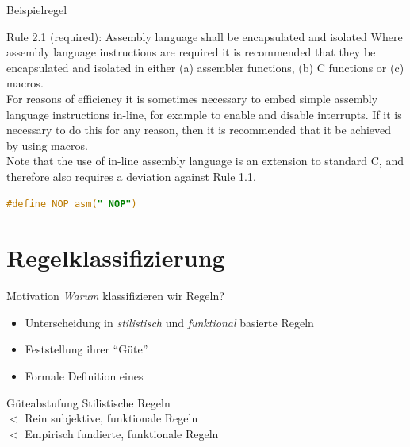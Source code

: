 \documentclass{beamer}
\begin{document}
    \begin{frame}[fragile]{Beispielregel}
        \begin{exampleblock}{Rule 2.1 (required): Assembly language shall be encapsulated and isolated}
            Where assembly language instructions are required it is recommended that they be encapsulated
            and isolated in either (a) assembler functions, (b) C functions or (c) macros.\\
            For reasons of efficiency it is sometimes necessary to embed simple assembly language instructions
            in-line, for example to enable and disable interrupts.
            If it is necessary to do this for any reason, then it is recommended that it be achieved by using macros.\\
            Note that the use of in-line assembly language is an extension to standard C, and therefore also
            requires a deviation against Rule 1.1.
            \begin{lstlisting}[language=C]
                #define NOP asm(" NOP")
            \end{lstlisting}
        \end{exampleblock}
    \end{frame}

    \section{Regelklassifizierung}
    \label{sec:regelklassifizierung}
    \begin{frame}{Motivation}
        \textit{Warum} klassifizieren wir Regeln?
        \pause
        \begin{itemize}
            \item Unterscheidung in \textit{stilistisch} und \textit{funktional} basierte Regeln
            \item Feststellung ihrer \enquote{Güte}
            \item Formale Definition eines \slss
        \end{itemize}
        \pause
        \begin{block}{Güteabstufung}
            \quad \quad Stilistische Regeln\\
            {\boldmath $<$} \quad Rein subjektive, funktionale Regeln\\
            {\boldmath $<$} \quad Empirisch fundierte, funktionale Regeln
        \end{block}
    \end{frame}
\end{document}
